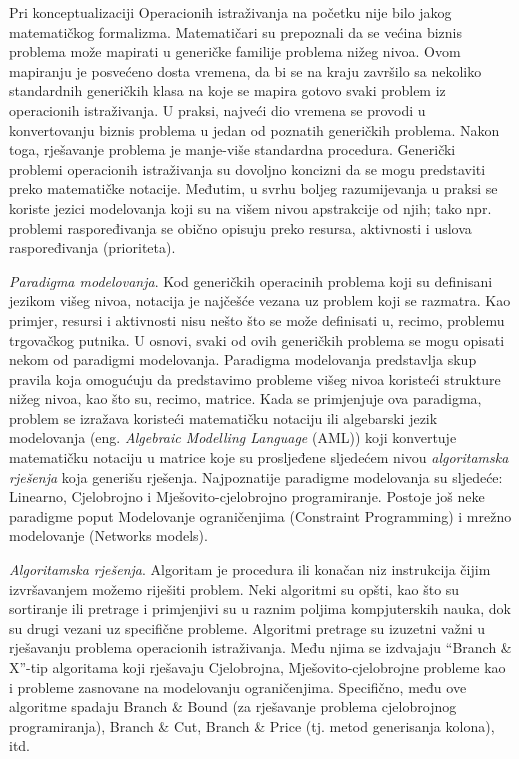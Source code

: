 \documentclass[a4paper, utf8, 11pt, colorlinks]{article}
\begin{document}
Pri konceptualizaciji Operacionih istraživanja na početku nije bilo jakog matematičkog formalizma. Matematičari su prepoznali da se većina biznis problema može  mapirati u generičke familije problema nižeg nivoa. Ovom mapiranju je posvećeno dosta vremena, da bi se na kraju završilo sa nekoliko standardnih generičkih klasa na koje se mapira gotovo svaki problem iz operacionih istraživanja. U praksi, najveći dio vremena se provodi u konvertovanju biznis problema u jedan od poznatih generičkih problema. Nakon toga, rješavanje problema je manje-više standardna procedura. Generički problemi operacionih istraživanja su dovoljno koncizni da se mogu predstaviti preko matematičke notacije. Međutim, u svrhu boljeg razumijevanja u praksi se koriste jezici modelovanja koji su na višem nivou apstrakcije od njih; tako npr. problemi raspoređivanja se obično opisuju preko resursa, aktivnosti i uslova raspoređivanja (prioriteta). 

\emph{Paradigma modelovanja}. Kod generičkih operacinih problema koji su definisani jezikom višeg nivoa, notacija je najčešće vezana uz problem koji se razmatra.
Kao primjer, resursi i aktivnosti nisu nešto što se može definisati u, recimo, problemu trgovačkog putnika. U osnovi, svaki od ovih generičkih problema se mogu opisati nekom od paradigmi modelovanja. Paradigma modelovanja predstavlja skup pravila koja omogućuju da predstavimo probleme višeg nivoa koristeći strukture nižeg nivoa, kao što su, recimo, matrice. Kada se primjenjuje ova paradigma, problem se izražava koristeći matematičku notaciju ili algebarski jezik modelovanja (eng. \emph{Algebraic Modelling Language} (AML)) koji konvertuje matematičku notaciju u matrice koje su prosljeđene sljedećem nivou \emph{algoritamska rješenja} koja generišu rješenja. Najpoznatije paradigme modelovanja su sljedeće: Linearno, Cjelobrojno i Mješovito-cjelobrojno programiranje. Postoje još neke paradigme poput Modelovanje ograničenjima (Constraint Programming) i mrežno modelovanje (Networks models). 

\emph{Algoritamska rješenja}. Algoritam je procedura ili konačan niz instrukcija čijim izvršavanjem možemo riješiti problem. Neki algoritmi su opšti, kao što su sortiranje ili pretrage i primjenjivi su u raznim poljima kompjuterskih nauka, dok su drugi vezani uz specifične probleme. Algoritmi pretrage su izuzetni važni u rješavanju problema operacionih istraživanja. Među njima se izdvajaju ``Branch \& X''-tip algoritama koji rješavaju Cjelobrojna, Mješovito-cjelobrojne probleme kao i probleme zasnovane na modelovanju ograničenjima. Specifično, među ove algoritme spadaju Branch \& Bound (za rješavanje problema cjelobrojnog programiranja), Branch \& Cut, Branch \& Price (tj. metod generisanja kolona), itd.
\end{document}
